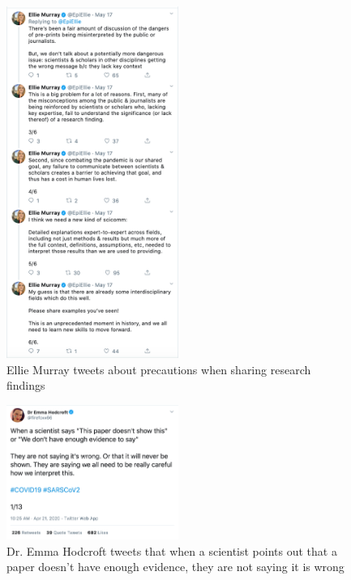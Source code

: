 \documentclass[acmsmall,authordraft]{acmart}
\begin{document}
\begin{figure}
  \includegraphics[width=0.5\textwidth]{Pictures/Appendix_Tweets/ellie murray tweet contd.png}
  \caption{Ellie Murray tweets about precautions when sharing research findings}
  \label{ellie_murray_tweet_contd}
\end{figure}

\begin{figure}
  \includegraphics[width=0.5\textwidth]{Pictures/Appendix_Tweets/emma hodcroft tweet.png}
  \caption{Dr. Emma Hodcroft tweets that when a scientist points out that a paper doesn't have enough evidence, they are not saying it is wrong}
  \label{emma_hodcroft_tweet}
\end{figure}
\end{document}
